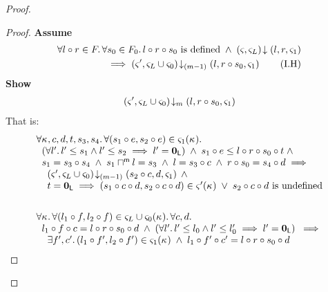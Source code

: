 \begin{lemma}[]
\begin{proof}
\begin{proof}
\noindent\textbf{Assume}
\begin{align}
	\forall l \circ r \in F.\,\forall s_0 \in F_0.\, l \circ r \circ s_0  \text{ is defined}  \;\land\; \left(\varsigma_{}, \varsigma_{L}\right) \!\downarrow \left(l, r, \varsigma_{1}\right) \nonumber \\
	\implies \left(\varsigma_{}', \varsigma_{L} \cup \varsigma_{0}\right) \!\downarrow_{(m-1)} \left(l, r \circ s_0, \varsigma_{1}\right)
	\tag{I.H} \label{LAW2:I.H}
\end{align}
\textbf{Show } 
%
\begin{align}
	\left(\varsigma_{}', \varsigma_{L} \cup \varsigma_{0}\right) \!\downarrow_{m} \left(l, r \circ s_0, \varsigma_{1}\right) \nonumber
\end{align}
%
That is:
%
\begin{align}
	&\begin{array}{l}
		\forall \kappa_{}, c, d, t, s_3, s_4.\,\forall (s_1 \circ e, s_2 \circ e) \in \varsigma_{1}(\kappa_{}).\, \\
	\hspace*{0.2cm}\left(\forall l'.\, l' \leq s_1 \land l' \leq s_2 \implies l' = \mathbf{0}_{\textsf{L}}\right) \;\land\; s_1 \circ e \leq  l \circ r \circ s_0 \circ t\;\land\\
	\hspace*{0.2cm} s_1 = s_3 \circ s_4 \;\land\; s_1 \sqcap_{}^{\textsf{m}} l = s_3 \;\land\; l = s_3 \circ c \;\land\; r \circ s_0 = s_4 \circ d \implies\\
	\hspace*{0.4cm} \left(\varsigma_{}', \varsigma_{L} \cup \varsigma_{0}\right) \!\downarrow_{(m-1)} \left(s_2 \circ c, d, \varsigma_{1}\right) \;\land\\
	\hspace*{0.4cm} t = \mathbf{0}_{\textsf{L}} \implies (s_1 \circ c \circ d, s_2 \circ c \circ d) \in \varsigma_{}'(\kappa_{}) 
	\;\lor\; s_2 \circ c \circ d \text{ is undefined}
	\end{array} \label{LAW:Goal10} \\\nonumber\\
	&\begin{array}{l}
		\forall \kappa_{}.\, \forall (l_1 \circ f, l_2 \circ f) \in \varsigma_{L} \cup \varsigma_{0}(\kappa_{}).\, \forall c, d.\, \\
		\hspace*{0.2cm} l_1 \circ f \circ c = l \circ r \circ s_0 \circ d \;\land\; \left(\forall l'.\, l' \leq l_0 \land l' \leq l'_0 \implies l' = \mathbf{0}_{\textsf{L}}\right)  \;\implies\\
  \hspace*{0.4cm}\exists f', c'.\, (l_1 \circ f', l_2 \circ f') \in \varsigma_{1}(\kappa_{}) \;\land\; l_1 \circ f' \circ c' =  l \circ r \circ s_0 \circ d\\

\end{array}
\end{align}
\end{proof}
\end{proof}
\end{lemma}
